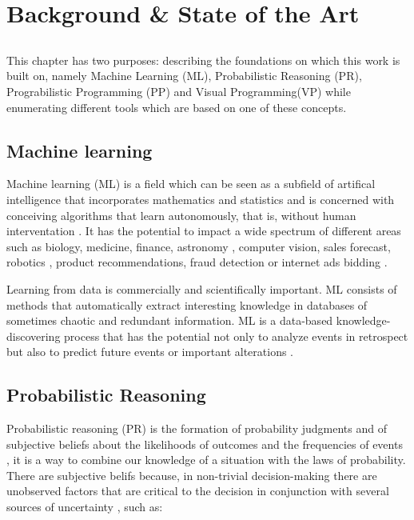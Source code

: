 \chapter{Background \& State of the Art} \label{chap:sota}

\section*{}

This chapter has two purposes: describing the foundations on which this work
is built on, namely Machine Learning (ML), Probabilistic Reasoning (PR),
Prograbilistic Programming (PP) and
Visual Programming(VP) while enumerating different tools which are based
on one of these concepts.

\section{Machine learning}

Machine learning (ML) is a field which can be seen as a subfield of artifical
intelligence that incorporates mathematics and statistics and is concerned
with conceiving algorithms that learn autonomously, that is, without human
interventation \cite{mlbrit}\cite{mlnot}.
It has the potential to impact a wide spectrum of
different areas such as biology, medicine, finance, astronomy
\cite{Amatriain:2013:BDU:2541176.2514691}, computer vision, sales forecast,
robotics \cite{intml}, product recommendations, fraud detection or
internet ads bidding \cite{SciPy}.

Learning from data is commercially and scientifically important. ML consists of
methods that automatically extract interesting knowledge in databases of sometimes chaotic and
redundant information. ML is a data-based knowledge-discovering process that
has the potential not only to analyze events in retrospect but also to predict
future events or important alterations \cite{mapt}.

\section{Probabilistic Reasoning}

Probabilistic reasoning (PR) is the formation of probability judgments and of
subjective beliefs about the likelihoods of outcomes and the frequencies of
events \cite{Lassiter2012}, it is a way to combine our knowledge of a situation
with the laws of probability. There are subjective belifs because, in non-trivial
decision-making there are unobserved factors that are critical to the decision
in conjunction with several sources of uncertainty \cite{reas}, such as:

